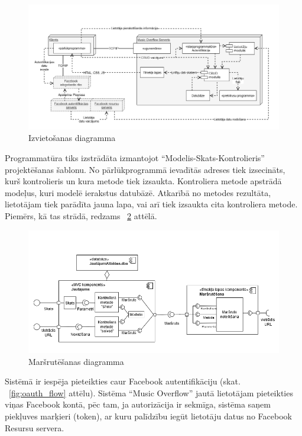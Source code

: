 \documentclass[12pt]{article}
\begin{document}
\begin{figure}[H]
\begin{center}
	\includegraphics[scale=0.35]{DeploymentDiagram.png}
	\caption{Izvietošanas diagramma}
	\label{fig:deployment_diagram}
\end{center}
\end{figure}

Programmatūra tiks izstrādāta izmantojot ``Modelis-Skats-Kontrolieris'' projektēšanas šablonu. No pārlūkprogrammā ievadītās adreses tiek izsecināts, kurš kontrolieris un kura metode tiek izsaukta. Kontroliera metode apstrādā modeļus, kuri modelē ierakstus datubāzē. Atkarībā no metodes rezultāta, lietotājam tiek parādīta jauna lapa, vai arī tiek izsaukta cita kontroliera metode. Piemērs, kā tas strādā, redzams ~\ref{fig:routing} attēlā. 

\begin{figure}[H]
\begin{center}
	\includegraphics[scale=0.5]{routing.png}
	\caption{Maršrutēšanas diagramma}
	\label{fig:routing}
\end{center}
\end{figure}

Sistēmā ir iespēja pieteikties caur Facebook autentifikāciju (skat. ~\ref{fig:oauth_flow} attēlu). Sistēma ``Music Overflow'' jautā lietotājam pieteikties viņas Facebook kontā, pēc tam, ja autorizācija ir sekmīga, sistēma saņem piekļuves marķieri (token), ar kuru palīdzību iegūt lietotāju datus no Facebook Resursu servera. 
\end{document}
